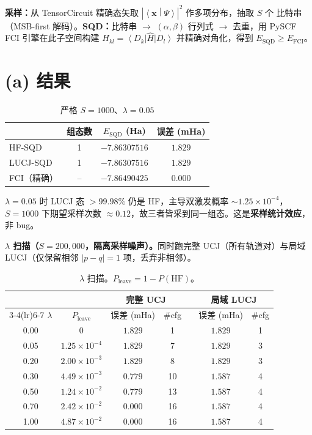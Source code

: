 \documentclass[11pt,a4paper]{article}
\newcommand{\ket}[1]{\left|#1\right\rangle}
\newcommand{\bra}[1]{\left\langle#1\right|}
\newcommand{\braket}[2]{\left\langle#1\middle|#2\right\rangle}
\newcommand{\HF}{\text{HF}}
\begin{document}
\textbf{采样：}从 TensorCircuit 精确态矢取 $|\braket{\bm{x}}{\Psi}|^2$ 作多项分布，抽取 $S$ 个
比特串（MSB-first 解码）。\textbf{SQD：}比特串 $\to$ $(\alpha,\beta)$ 行列式 $\to$ 去重，用
PySCF FCI 引擎在此子空间构建 $H_{kl}=\bra{D_k}\hat H\ket{D_l}$ 并精确对角化，得到
$E_{\text{SQD}}\ge E_{\text{FCI}}$。

\section{(a) 结果}

\begin{table}[h]
\centering
\caption{严格 $S=1000$、$\lambda=0.05$}
\vspace{2pt}
\begin{tabular}{lccc}\toprule
 & 组态数 & $E_{\text{SQD}}$ (Ha) & 误差 (mHa)\\\midrule
HF-SQD        & 1 & $-7.86307516$ & $1.829$\\
LUCJ-SQD      & 1 & $-7.86307516$ & $1.829$\\
FCI（精确）    & --& $-7.86490425$ & $0.000$\\\bottomrule
\end{tabular}
\end{table}

$\lambda=0.05$ 时 LUCJ 态 $>99.98\%$ 仍是 HF，主导双激发概率 $\sim\!1.25\times10^{-4}$，
$S=1000$ 下期望采样次数 $\approx0.12$，故三者皆采到同一组态。这是\textbf{采样统计效应}，非 bug。

\bigskip
\textbf{$\lambda$ 扫描（$S=200{,}000$，隔离采样噪声）。}同时跑完整 UCJ（所有轨道对）与局域
LUCJ（仅保留相邻 $|p-q|=1$ 项，丢弃非相邻）。

\begin{table}[h]
\centering\small
\begin{tabular}{c c cc c cc}\toprule
 & &\multicolumn{2}{c}{完整 UCJ}&&\multicolumn{2}{c}{局域 LUCJ}\\
\cmidrule(lr){3-4}\cmidrule(lr){6-7}
$\lambda$ & $P_{\text{leave}}$ & 误差 (mHa) & \#cfg && 误差 (mHa) & \#cfg\\\midrule
0.00 & $0$              & $1.829$ & 1  && $1.829$ & 1\\
0.05 & $1.25\!\times\!10^{-4}$& $1.829$ & 7  && $1.829$ & 3\\
0.20 & $2.00\!\times\!10^{-3}$& $1.829$ & 8  && $1.829$ & 3\\
0.30 & $4.49\!\times\!10^{-3}$& $0.779$ & 10 && $\mathbf{1.587}$ & 4\\
0.50 & $1.24\!\times\!10^{-2}$& $0.779$ & 13 && $\mathbf{1.587}$ & 4\\
0.70 & $2.42\!\times\!10^{-2}$& $\mathbf{0.000}$ & 16 && $\mathbf{1.587}$ & 4\\
1.00 & $4.87\!\times\!10^{-2}$& $\mathbf{0.000}$ & 16 && $\mathbf{1.587}$ & 4\\\bottomrule
\end{tabular}
\caption{$\lambda$ 扫描。$P_{\text{leave}}=1-P(\HF)$。}
\end{table}
\end{document}
